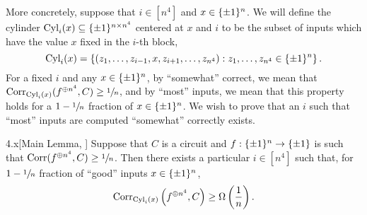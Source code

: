 \documentclass[11pt]{article}
\begin{document}
More concretely, suppose that $i \in [n^4]$ and $x \in \{\pm 1\}^n$. We will define the cylinder $\textup{Cyl}_i(x) \subseteq \{\pm 1\}^{n \times n^4}$ centered at $x$ and $i$ to be the subset of inputs which have the value $x$ fixed in the $i$-th block,
\begin{equation*}
    \textup{Cyl}_i(x) = \left\{(z_1, \ldots, z_{i - 1}, x, z_{i + 1}, \ldots, z_{n^4}) : z_1, \ldots, z_{n^4} \in \{\pm 1\}^n\right\}.
\end{equation*}
For a fixed $i$ and any $x \in \{\pm 1\}^n$, by ``somewhat'' correct, we mean that $\mathrm{Corr}_{\textup{Cyl}_i(x)}(f^{\oplus n^4}, C) \geq \sfrac{1}{n}$, and by ``most'' inputs, we mean that this property holds for a $1 - \sfrac{1}{n}$ fraction of $x \in \{\pm 1\}^n$. We wish to prove that an $i$ such that ``most'' inputs are computed ``somewhat'' correctly exists.

\begin{lemma}{4.x}[Main Lemma, \cite{BonehLipton}]
    Suppose that $C$ is a circuit and $f : \{\pm 1\}^n \rightarrow \{\pm 1\}$ is such that $\mathrm{Corr}(f^{\oplus n^4}, C) \geq \sfrac{1}{n}$. Then there exists a particular $i \in [n^4]$ such that, for $1 - \sfrac{1}{n}$ fraction of ``good'' inputs $x \in \{\pm 1\}^n$,
    \begin{equation*}
        \mathrm{Corr}_{\textup{Cyl}_i(x)}\left(f^{\oplus n^4}, C\right) \geq \Omega\left(\frac{1}{n}\right).
    \end{equation*}
\end{lemma}
\end{document}
